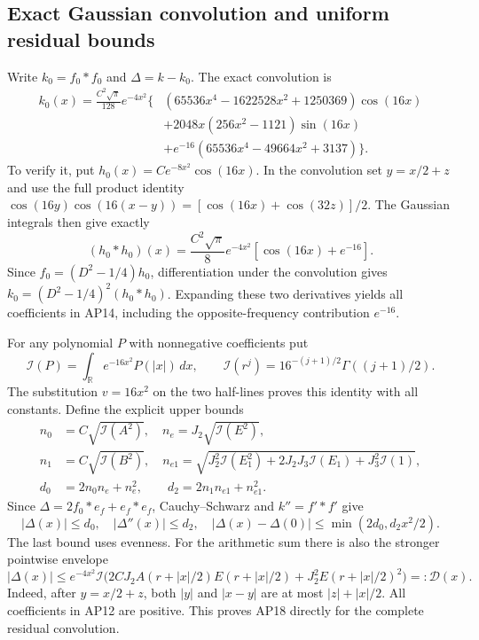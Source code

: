 \subsection{Exact Gaussian convolution and uniform residual bounds}
Write \(k_0=f_0*f_0\) and \(\Delta=k-k_0\). The exact convolution is
\[
\begin{split}
 k_0(x)=\frac{C^2\sqrt\pi}{128}e^{-4x^2}\bigl\{&
 (65536x^4-1622528x^2+1250369)\cos(16x)\\
 &+2048x(256x^2-1121)\sin(16x)\\
 &+e^{-16}(65536x^4-49664x^2+3137)\bigr\}.
\end{split}\tag{AP14}
\]
To verify it, put \(h_0(x)=Ce^{-8x^2}\cos(16x)\). In the
convolution set \(y=x/2+z\) and use the full product identity
\(\cos(16y)\cos(16(x-y))=[\cos(16x)+\cos(32z)]/2\).
The Gaussian integrals then give exactly
\[
 (h_0*h_0)(x)=\frac{C^2\sqrt\pi}{8}e^{-4x^2}
                       [\cos(16x)+e^{-16}].
\]
Since \(f_0=(D^2-1/4)h_0\), differentiation under the
convolution gives \(k_0=(D^2-1/4)^2(h_0*h_0)\).
Expanding these two derivatives yields all coefficients in AP14,
including the opposite-frequency contribution \(e^{-16}\).

For any polynomial \(P\) with nonnegative coefficients put
\[
 \mathcal I(P)=\int_{\mathbb R}e^{-16x^2}P(|x|)\,dx,
 \qquad \mathcal I(r^j)=16^{-(j+1)/2}\Gamma((j+1)/2).
 \tag{AP15}
\]
The substitution \(v=16x^2\) on the two half-lines proves this
identity with all constants. Define the explicit upper bounds
\[
\begin{split}
 n_0&=C\sqrt{\mathcal I(A^2)},\quad
 n_e=J_2\sqrt{\mathcal I(E^2)},\\
 n_1&=C\sqrt{\mathcal I(B^2)},\quad
 n_{e1}=\sqrt{J_2^2\mathcal I(E_1^2)+2J_2J_3\mathcal I(E_1)
                  +J_3^2\mathcal I(1)},\\
 d_0&=2n_0n_e+n_e^2,\qquad d_2=2n_1n_{e1}+n_{e1}^2.
\end{split}\tag{AP16}
\]
Since \(\Delta=2f_0*e_f+e_f*e_f\), Cauchy--Schwarz and
\(k''=f'*f'\) give
\[
 |\Delta(x)|\le d_0,\quad |\Delta''(x)|\le d_2,\quad
 |\Delta(x)-\Delta(0)|\le\min(2d_0,d_2x^2/2).
 \tag{AP17}
\]
The last bound uses evenness. For the arithmetic sum there is also
the stronger pointwise envelope
\[
 |\Delta(x)|\le e^{-4x^2}\mathcal I\bigl(
 2CJ_2 A(r+|x|/2)E(r+|x|/2)+J_2^2E(r+|x|/2)^2\bigr)
 =:\mathcal D(x).
 \tag{AP18}
\]
Indeed, after \(y=x/2+z\), both \(|y|\) and \(|x-y|\) are
at most \(|z|+|x|/2\). All coefficients in AP12 are positive.
This proves AP18 directly for the complete residual convolution.

